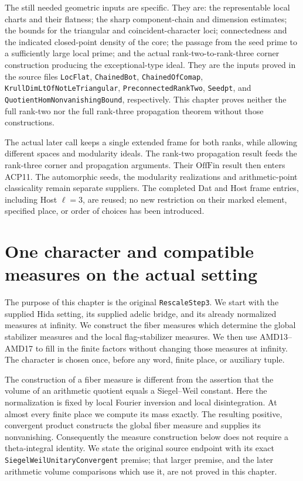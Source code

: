 \documentclass[11pt,a4paper]{article}
\numberwithin{equation}{section}
\theoremstyle{remark}\newtheorem{remark}[theorem]{Remark}
\begin{document}
The still needed geometric inputs are specific.  They are:
the representable local charts and their flatness; the sharp
component-chain and dimension estimates; the bounds for the
triangular and coincident-character loci; connectedness and
the indicated closed-point density of the core; the passage
from the seed prime to a sufficiently large local prime; and
the actual rank-two-to-rank-three corner construction producing
the exceptional-type ideal.  They are the inputs proved in
the source files \texttt{Loc\allowbreak Flat}, \texttt{Chained\allowbreak Bot},
\texttt{Chained\allowbreak Of\allowbreak Comap},
\texttt{Krull\allowbreak Dim\allowbreak Lt\allowbreak Of\allowbreak Not\allowbreak Le\allowbreak Triangular},
\texttt{Preconnected\allowbreak Rank\allowbreak Two}, \texttt{Seedpt}, and
\texttt{Quotient\allowbreak Hom\allowbreak Nonvanishing\allowbreak Bound}, respectively.
This chapter proves neither the full rank-two nor the full
rank-three propagation theorem without those constructions.

The actual later call keeps a single extended frame for both
ranks, while allowing different spaces and modularity ideals.
The rank-two propagation result feeds the rank-three corner
and propagation arguments.  Their \(\mathrm{OffFin}\) result
then enters ACP11.  The automorphic seeds, the modularity
realizations and arithmetic-point classicality remain separate
suppliers.  The completed Dat and Host frame entries, including
Host \(\ell=3\), are reused; no new restriction on their
marked element, specified place, or order of choices has
been introduced.



\section{One character and compatible measures on the actual setting}
\label{sec:global-measure-rescaling-v53}

The purpose of this chapter is the original \texttt{Rescale\allowbreak Step3}.
We start with the supplied Hida setting, its supplied adelic bridge, and
its already normalized measures at infinity.  We construct the fiber
measures which determine the global stabilizer measures and the local
flag-stabilizer measures.  We then use AMD13--AMD17 to fill in the finite
factors without changing those measures at infinity.  The character is
chosen once, before any word, finite place, or auxiliary tuple.

The construction of a fiber measure is different from the assertion
that the volume of an arithmetic quotient equals a Siegel--Weil
constant.  Here the normalization is fixed by local Fourier inversion
and local disintegration.  At almost every finite place we compute its
mass exactly.  The resulting positive, convergent product constructs the
global fiber measure and supplies its nonvanishing.  Consequently the
measure construction below does not require a theta-integral identity.
We state the original source endpoint with its exact
\texttt{Siegel\allowbreak Weil\allowbreak Unitary\allowbreak Convergent} premise; that larger premise, and the
later arithmetic volume comparisons which use it, are not proved in this
chapter.
\end{document}
